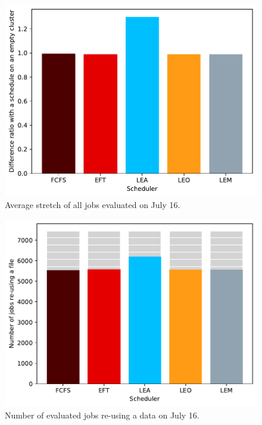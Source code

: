 \documentclass[conference,10pt]{IEEEtran}
\begin{document}
\begin{figure}[tb]\centering\includegraphics[scale=0.47]{../MBSS/plot/Results_FCFS_Score_Backfill_2022-07-16->2022-07-16_V10000_Mean_Stretch_450_128_32_256_4_1024.pdf}\caption{Average stretch of all jobs evaluated on July 16.}\label{stretch.07-16}\end{figure}
\begin{figure}[tb]\centering\includegraphics[scale=0.47]{../MBSS/plot/Results_FCFS_Score_Backfill_2022-07-16->2022-07-16_V10000_Number_of_data_reuse_450_128_32_256_4_1024.pdf}\caption{Number of evaluated jobs re-using a data on July 16.}\label{reuse.07-16}\end{figure}
\end{document}
